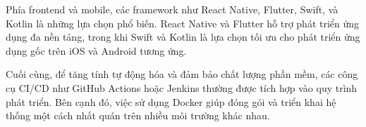       \begin{flushleft}
        \hspace*{0.8cm}Phía frontend và mobile, các framework như React Native, Flutter, Swift, và Kotlin là những lựa chọn phổ biến. React Native và Flutter hỗ trợ phát triển ứng dụng đa nền tảng, trong khi Swift và Kotlin là lựa chọn tối ưu cho phát triển ứng dụng gốc trên iOS và Android tương ứng.
      \end{flushleft}

      \begin{flushleft}
        \hspace*{0.8cm}Cuối cùng, để tăng tính tự động hóa và đảm bảo chất lượng phần mềm, các công cụ CI/CD như GitHub Actions hoặc Jenkins thường được tích hợp vào quy trình phát triển. Bên cạnh đó, việc sử dụng Docker giúp đóng gói và triển khai hệ thống một cách nhất quán trên nhiều môi trường khác nhau.
      \end{flushleft}
   